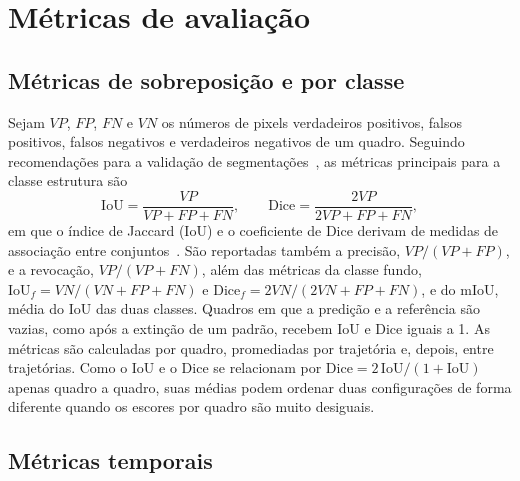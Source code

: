 \documentclass[final,5p,times,twocolumn]{elsarticle}
\begin{document}
\section{Métricas de avaliação}\label{sec:sec5}

\subsection{Métricas de sobreposição e por classe}\label{subsec:overlap}

Sejam $VP$, $FP$, $FN$ e $VN$ os números de pixels verdadeiros positivos, falsos positivos, falsos negativos e verdadeiros negativos de um quadro. Seguindo recomendações para a validação de segmentações~\cite{taha2015,maierhein2024}, as métricas principais para a classe estrutura são
\begin{equation}\label{eq:iou}
\mathrm{IoU}=\frac{VP}{VP+FP+FN}, \qquad \mathrm{Dice}=\frac{2VP}{2VP+FP+FN},
\end{equation}
em que o índice de Jaccard (IoU) e o coeficiente de Dice derivam de medidas de associação entre conjuntos~\cite{jaccard1912,dice1945}. São reportadas também a precisão, $VP/(VP+FP)$, e a revocação, $VP/(VP+FN)$, além das métricas da classe fundo, $\mathrm{IoU}_{f}=VN/(VN+FP+FN)$ e $\mathrm{Dice}_{f}=2VN/(2VN+FP+FN)$, e do mIoU, média do IoU das duas classes. Quadros em que a predição e a referência são vazias, como após a extinção de um padrão, recebem IoU e Dice iguais a 1. As métricas são calculadas por quadro, promediadas por trajetória e, depois, entre trajetórias. Como o IoU e o Dice se relacionam por $\mathrm{Dice}=2\,\mathrm{IoU}/(1+\mathrm{IoU})$ apenas quadro a quadro, suas médias podem ordenar duas configurações de forma diferente quando os escores por quadro são muito desiguais.

\subsection{Métricas temporais}\label{subsec:temporal}
\end{document}
